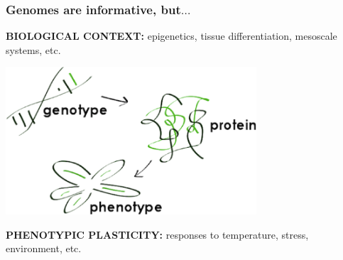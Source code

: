 %
\begin{frame}
  \frametitle{Genomes are informative, but$\ldots$}
  \textcolor{hutton_blue}{\textbf{BIOLOGICAL CONTEXT:}} epigenetics, tissue differentiation, mesoscale systems, etc.\\
  \begin{center}  
    \includegraphics[width=0.7\textwidth]{images/genotype_protein_phenotype}
  \end{center}    
  \textcolor{hutton_green}{\textbf{PHENOTYPIC PLASTICITY:}} responses to temperature, stress, environment, etc.
\end{frame}

